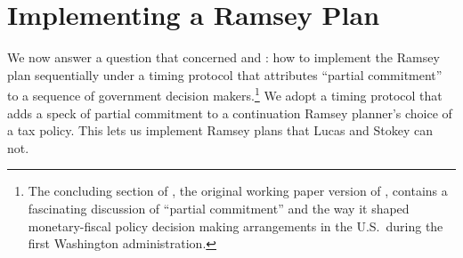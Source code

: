 \documentclass[12pt]{article}
\newcommand{\TS}[1]{{\textcolor{magenta}{#1}}}
\begin{document}
\section{Implementing a Ramsey Plan \label{implementation}}
We now  answer  a question that concerned \cite{LucasStokey1983} and \cite*{debortoli2021optimal}: how to implement the Ramsey plan sequentially under a timing protocol
that attributes ``partial commitment'' to a sequence of government decision makers.\footnote{The concluding section of \cite{lucas1982optimal}, the original working paper version of \cite{LucasStokey1983}, contains a fascinating discussion
of ``partial commitment'' and the way it shaped monetary-fiscal policy decision making arrangements in the U.S.~during the first Washington administration.}
We adopt a timing protocol that    adds a speck of  partial commitment to a continuation Ramsey planner's choice of a tax policy.
This lets us implement  Ramsey plans
that Lucas and Stokey can  not.%


%
\end{document}
